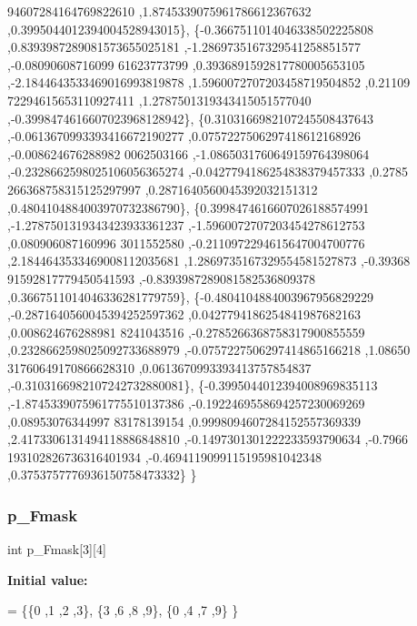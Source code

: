 \begin{DoxyCode}
      94607284164769822610 ,1.8745339075961786612367632 ,0.3995044012394004528943015\},
\{-0.3667511014046338502225808 ,0.8393987289081573655025181 ,-1.2869735167329541258851577 ,-0.08090608716099
      61623773799 ,0.3936891592817780005653105 ,-2.1844643533469016993819878 ,1.5960072707203458719504852 ,0.21109
      72294615653110927411 ,1.2787501319343415051577040 ,-0.3998474616607023968128942\},
\{0.3103166982107245508437643 ,-0.0613670993393416672190277 ,0.0757227506297418612168926 ,-0.008624676288982
      0062503166 ,-1.0865031760649159764398064 ,-0.2328662598025106056365274 ,-0.0427794186254838379457333 ,0.2785
      266368758315125297997 ,0.2871640560045392032151312 ,0.4804104884003970732386790\},
\{0.3998474616607026188574991 ,-1.2787501319343423933361237 ,-1.5960072707203454278612753 ,0.080906087160996
      3011552580 ,-0.2110972294615647004700776 ,2.1844643533469008112035681 ,1.2869735167329554581527873 ,-0.39368
      91592817779450541593 ,-0.8393987289081582536809378 ,0.3667511014046336281779759\},
\{-0.4804104884003967956829229 ,-0.2871640560045394252597362 ,0.0427794186254841987682163 ,0.008624676288981
      8241043516 ,-0.2785266368758317900855559 ,0.2328662598025092733688979 ,-0.0757227506297414865166218 ,1.08650
      31760649170866628310 ,0.0613670993393413757854837 ,-0.3103166982107242732880081\},
\{-0.3995044012394008969835113 ,-1.8745339075961775510137386 ,-0.1922469558694257230069269 ,0.08953076344997
      83178139154 ,0.9998094607284152557369339 ,2.4173306131494118886848810 ,-0.1497301301222233593790634 ,-0.7966
      193102826736316401934 ,-0.4694119099115195981042348 ,0.3753757776936150758473332\}
\}
\end{DoxyCode}
\mbox{\label{a00993_a9e8002d4e70ec8468d74e26db0e92bda}} 
\subsubsection{\texorpdfstring{p\+\_\+\+Fmask}{p\_Fmask}}
{\footnotesize\ttfamily int p\+\_\+\+Fmask\mbox{[}3\mbox{]}\mbox{[}4\mbox{]}}

{\bfseries Initial value\+:}
\begin{DoxyCode}
= \{\{0 ,1 ,2 ,3\},
\{3 ,6 ,8 ,9\},
\{0 ,4 ,7 ,9\}
\}
\end{DoxyCode}
\mbox{\label{a00993_aefff047c0c87461150b141f54f837e81}} 
